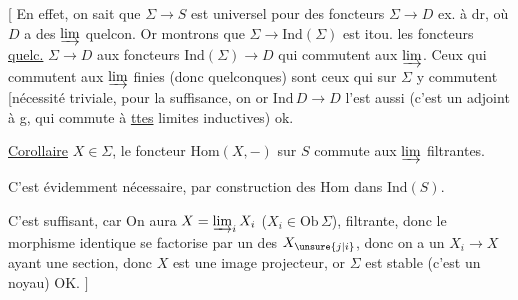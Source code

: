 [ En effet,  on sait que $\Sigma\longrightarrow S$ est universel pour des foncteurs $\Sigma\longrightarrow D$ ex. à dr, où $D$ a des $\varinjlim$ quelcon. Or montrons que $\Sigma\longrightarrow\mathrm{Ind}(\Sigma)$ est  itou.   les foncteurs \uline{quelc.} $\Sigma\longrightarrow D$ 
aux foncteurs $\mathrm{Ind}(\Sigma)\longrightarrow D$ qui commutent aux $\varinjlim$. Ceux qui commutent aux $\varinjlim$ finies (donc quelconques) sont ceux qui sur $\Sigma$ y commutent [nécessité triviale, pour la suffisance, on   or $\mathrm{Ind}\,D\longrightarrow D$ l'est aussi (c'est un adjoint à g, qui commute à \uline{ttes} limites inductives) ok.

\uline{Corollaire}   $X\in\Sigma$,  le foncteur $\mathrm{Hom}(X,-)$ sur $S$ commute aux $\varinjlim$ filtrantes.


C'est évidemment nécessaire, par construction des Hom dans $\mathrm{Ind}(S)$.

C'est suffisant, car  On aura $X=\varinjlim_i X_i$ ($X_i\in\mathrm{Ob}\,\Sigma$), filtrante, donc le morphisme identique se factorise par un des $X_{\unsure{j|i}}$, donc on a un $X_i\longrightarrow X$ ayant une section, donc $X$ est une  image projecteur, or $\Sigma$ est  stable  (c'est un noyau)  OK. $]$
